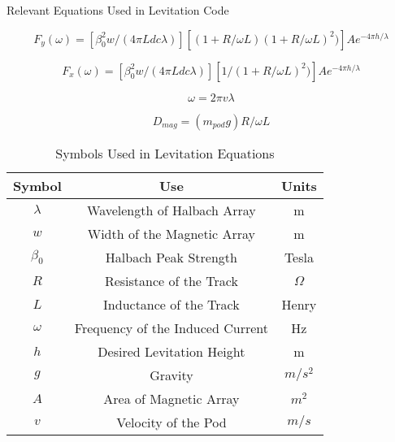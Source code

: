 \documentclass[12]{article}
\begin{document}
\centering
Relevant Equations Used in Levitation Code

$$F_{y}(\omega)=[\beta _{0}^{2}w/(4\pi Ldc\lambda )][( 1+R/\omega L)(1+R/\omega L)^{2})]Ae^{-4\pi h/\lambda }$$

$$F_{x}(\omega)=[\beta _{0}^{2}w/(4\pi Ldc\lambda )][1/(1+R/\omega L)^{2})]Ae^{-4\pi h/\lambda }$$

$$\omega =2\pi v\lambda $$

$$D_{mag}=( m_{pod}g)R/\omega L$$

\begin{table}[ht]
	\caption{Symbols Used in Levitation Equations}
	\centering
	\begin{tabular}{c c c}
		\hline\hline
		Symbol       & Use                              & Units     \\ [0.5ex]
		\hline
		$\lambda$    & Wavelength of Halbach Array      & m         \\
		$w$          & Width of the Magnetic Array      & m         \\
		$\beta _{0}$ & Halbach Peak Strength            & Tesla     \\
		$R$          & Resistance of the Track          & $\Omega$  \\
		$L$          & Inductance of the Track          & Henry     \\
		$\omega$     & Frequency of the Induced Current & Hz        \\
		$h$          & Desired Levitation Height        & m         \\
		$g$          & Gravity                          & $m/s^{2}$ \\
		$A$          & Area of Magnetic Array           & $m^{2}$   \\
		$v$          & Velocity of the Pod              & $m/s$     \\ [1ex]

		\hline
	\end{tabular}
	\label{table:nonlin}
\end{table}
\end{document}
